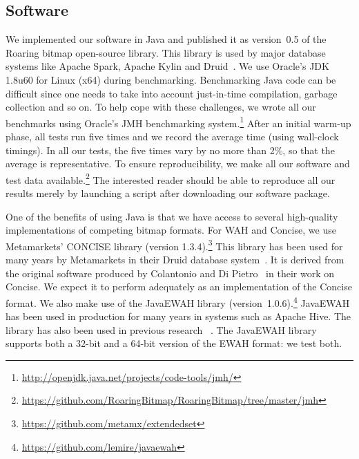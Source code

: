 \documentclass[times]{speauth}
\begin{document}
\subsection{Software}
\label{sec:software}
We implemented our software in Java and published it as version~0.5 of the Roaring bitmap open-source library.
This library is used by major database systems like Apache Spark,  Apache Kylin  and Druid~\cite{Yang:2014:DRA:2588555.2595631}.
 We use Oracle's JDK 1.8u60 for  Linux (x64) during benchmarking. Benchmarking Java code can
be difficult since one needs to take into account just-in-time compilation, garbage collection and so on. To help cope with these challenges, we wrote all our benchmarks using Oracle's JMH benchmarking system.\footnote{\url{http://openjdk.java.net/projects/code-tools/jmh/}} After an initial warm-up phase, all tests run five times and we record the average time (using wall-clock timings). In all our tests, the
five times vary
by no more than 2\%, so that the average is representative. 
To ensure reproducibility, we make all our software and test data available.\footnote{\url{https://github.com/RoaringBitmap/RoaringBitmap/tree/master/jmh}} 
The interested reader should be able to reproduce all our results merely by launching a script after downloading our software package.

One of the benefits of using Java is that we have access to several
high-quality implementations of competing bitmap formats. For WAH and Concise, we use Metamarkets' CONCISE library (version 1.3.4).\footnote{\url{https://github.com/metamx/extendedset}} This library has
been used for many years by Metamarkets in their Druid database system~\cite{Yang:2014:DRA:2588555.2595631}. It is derived from the original
software produced by Colantonio and Di Pietro~\cite{colantonio:2010:ccn:1824821.1824857} in their work on Concise. We expect it to
perform adequately as an implementation of the Concise format.
  We also make use of the JavaEWAH library (version~1.0.6).\footnote{\url{https://github.com/lemire/javaewah}} JavaEWAH has been used in production for many years in
systems
such as
Apache Hive.  The library has
also been used
in previous research%
~\cite{SPE:SPE2289,arxiv:0901.3751,Nagendra:2015:EPS:2799368.2699483,Nagarkar:2015:CSH:2824032.2824038}. The JavaEWAH library supports both a 32-bit and a 64-bit version of the EWAH format: we test both.
\end{document}
